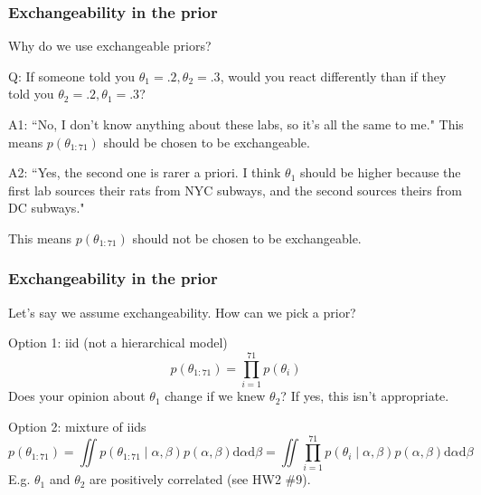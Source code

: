 \documentclass{beamer}
\begin{document}
\begin{frame}
\frametitle{Exchangeability in the prior}

Why do we use exchangeable priors?
\newline

Q: If someone told you $\theta_1 = .2, \theta_2 =.3$, would you react differently than if they told you $\theta_2 = .2, \theta_1 =.3$?
\pause
\newline

A1: ``No, I don't know anything about these labs, so it's all the same to me." 
\newline
This means $p(\theta_{1:71})$ should be chosen to be exchangeable.
\newline


A2: ``Yes, the second one is rarer a priori. I think $\theta_1$ should be higher because the first lab sources their rats from NYC subways, and the second sources theirs from DC subways." 
\newline

This means $p(\theta_{1:71})$ should not be chosen to be exchangeable.


\end{frame}


\begin{frame}
\frametitle{Exchangeability in the prior}

Let's say we assume exchangeability. How can we pick a prior?
\newline

Option 1: iid (not a hierarchical model)
\[
p(\theta_{1:71}) = \prod_{i=1}^{71} p(\theta_{i})
\]
Does your opinion about $\theta_1$ change if we knew $\theta_2$? If yes, this isn't appropriate.
\newline

Option 2: mixture of iids
\[
p(\theta_{1:71}) = \iint p(\theta_{1:71} \mid \alpha, \beta)p(\alpha, \beta) \text{d}\alpha\text{d}\beta = \iint \prod_{i=1}^{71} p(\theta_{i} \mid \alpha, \beta)p(\alpha, \beta) \text{d}\alpha\text{d}\beta
\]
E.g. $\theta_1$ and $\theta_2$ are positively correlated (see HW2 \#9). 
\newline


\end{frame}
\end{document}
